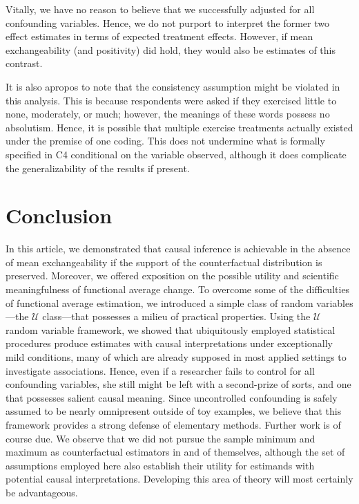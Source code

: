 \documentclass[12pt]{amsart}
\theoremstyle{plain}%
\theoremstyle{definition}
\theoremstyle{remark}
\numberwithin{equation}{section}
\begin{document}
Vitally, we have no reason to believe that we successfully adjusted for all confounding variables. Hence, we do not purport to interpret the former two effect estimates in terms of expected treatment effects. However, if mean exchangeability (and positivity) did hold, they would also be estimates of this contrast.

It is also apropos to note that the consistency assumption might be violated in this analysis. This is because respondents were asked if they exercised little to none, moderately, or much; however, the meanings of these words possess no absolutism. Hence, it is possible that multiple exercise treatments actually existed under the premise of one coding. This does not undermine what is formally specified in C4 conditional on the variable observed, although it does complicate the generalizability of the results if present.

\section{Conclusion}
In this article, we demonstrated that causal inference is achievable in the absence of mean exchangeability if the support of the counterfactual distribution is preserved. Moreover, we offered exposition on the possible utility and scientific meaningfulness of functional average change. To overcome some of the difficulties of functional average estimation, we introduced a simple class of random variables---the $\mathcal{U}$ class---that possesses a milieu of practical properties. Using the $\mathcal{U}$ random variable framework, we showed that ubiquitously employed statistical procedures produce estimates with causal interpretations under exceptionally mild conditions, many of which are already supposed in most applied settings to investigate associations. Hence, even if a researcher fails to control for all confounding variables, she still might be left with a second-prize of sorts, and one that possesses salient causal meaning. Since uncontrolled confounding is safely assumed to be nearly omnipresent outside of toy examples, we believe that this framework provides a strong defense of elementary methods. Further work is of course due. We observe that we did not pursue the sample minimum and maximum as counterfactual estimators in and of themselves, although the set of assumptions employed here also establish their utility for estimands with potential causal interpretations. Developing this area of theory will most certainly be advantageous.
\end{document}
